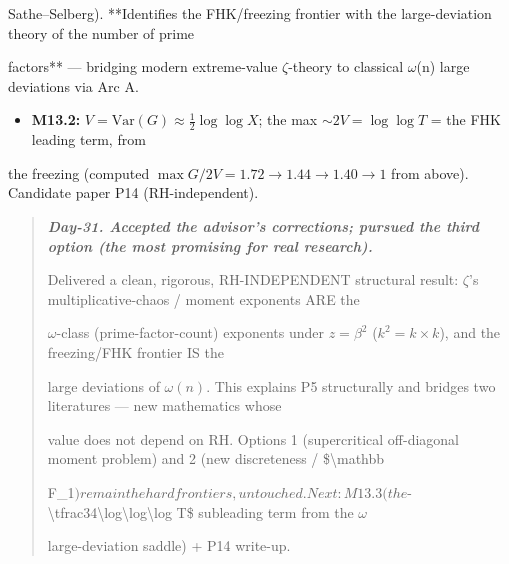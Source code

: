 \documentclass[10pt]{article}
\begin{document}
  Sathe--Selberg). **Identifies the FHK/freezing frontier with the large-deviation theory of the number of prime\par
  factors** --- bridging modern extreme-value \ensuremath{\zeta}-theory to classical \ensuremath{\omega}(n) large deviations via Arc A.\par
\begin{itemize}
\item \textbf{M13.2:} $V=\mathrm{Var}(G)\approx\tfrac12\log\log X$; the max $\sim2V=\log\log T$ = the FHK leading term, from
\end{itemize}
  the freezing (computed $\max G/2V=1.72\to1.44\to1.40\to1$ from above). Candidate paper P14 (RH-independent).\par

\begin{quote}\itshape
\textbf{Day-31. Accepted the advisor's corrections; pursued the third option (the most promising for real research).}\par
Delivered a clean, rigorous, RH-INDEPENDENT structural result: \ensuremath{\zeta}'s multiplicative-chaos / moment exponents ARE the\par
\ensuremath{\omega}-class (prime-factor-count) exponents under $z=\beta^2$ ($k^2=k\times k$), and the freezing/FHK frontier IS the\par
large deviations of $\omega(n)$. This explains P5 structurally and bridges two literatures --- new mathematics whose\par
value does not depend on RH. Options 1 (supercritical off-diagonal moment problem) and 2 (new discreteness / \$\textbackslash{}mathbb\par
F\_1$) remain the hard frontiers, untouched. Next: M13.3 (the $-\textbackslash{}tfrac34\textbackslash{}log\textbackslash{}log\textbackslash{}log T\$ subleading term from the \ensuremath{\omega}\par
large-deviation saddle) + P14 write-up.\par
\end{quote}
\end{document}
